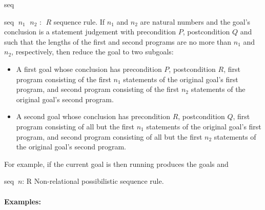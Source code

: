 \begin{tactic}{seq}
  \begin{tsyntax}{seq $\;n_1$ $\;n_2$ : $\;R$}
    \prhl sequence rule. If $n_1$ and $n_2$ are natural numbers and
    the goal's conclusion is a \prhl statement judgement with
    precondition $P$, postcondition $Q$ and such that the lengths of
    the first and second programs are no more than $n_1$ and $n_2$,
    respectively, then reduce the goal to two subgoals:
    \begin{itemize}
    \item A first goal whose conclusion has precondition $P$,
      postcondition $R$, first program consisting of the first $n_1$
      statements of the original goal's first program, and second
      program consisting of the first $n_2$ statements of the original
      goal's second program.

    \item A second goal whose conclusion has precondition $R$,
      postcondition $Q$, first program consisting of all but the first
      $n_1$ statements of the original goal's first program, and
      second program consisting of all but the first $n_2$ statements
      of the original goal's second program.
    \end{itemize}

  \bigskip
  For example, if the current goal is
   then
  running 
  produces the goals
  and
  \end{tsyntax}

  \begin{tsyntax}{seq $\ n$: R}
  Non-relational possibilistic sequence rule.

  \paragraph{Examples:}\strut

  \begin{cmathpar}
    { \\ }
    {}
  \end{cmathpar}
  \end{tsyntax}


\end{tactic}
